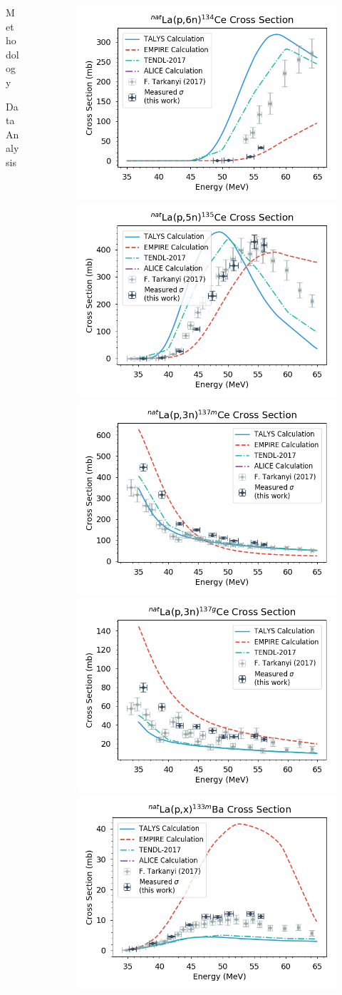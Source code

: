 \documentclass[final]{beamer}
\newlength{\sepwid}
\newlength{\onecolwid}
\newlength{\threecolwid}
\begin{document}
\begin{frame}[t]
\begin{columns}[t]
\begin{column}{\onecolwid}
\begin{block}{Methodology}
\begin{block}{Data Analysis}
{}
\end{block}


\end{block}

\end{column} %
\begin{column}{\sepwid}\end{column} %
\begin{column}{\threecolwid} %

\begin{figure}
\includegraphics[width=0.32\linewidth]{cross_sections/134CE.png}
\includegraphics[width=0.32\linewidth]{cross_sections/135CE.png}
\includegraphics[width=0.32\linewidth]{cross_sections/137CEm.png}\\
\includegraphics[width=0.32\linewidth]{cross_sections/137CEg.png}
\includegraphics[width=0.32\linewidth]{cross_sections/133BAm.png}

\end{figure}
\end{column}
\end{columns}
\end{frame}
\end{document}
